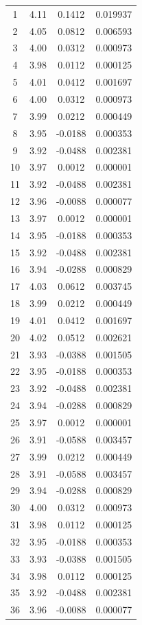 \documentclass[14pt,a4paper]{extarticle}
\begin{document}
{\begin{longtable}{|c|c|c|c|}
1  & 4.11 & 0.1412 & 0.019937 \\
2  & 4.05 & 0.0812 & 0.006593 \\
3  & 4.00 & 0.0312 & 0.000973 \\
4  & 3.98 & 0.0112 & 0.000125 \\
5  & 4.01 & 0.0412 & 0.001697 \\
6  & 4.00 & 0.0312 & 0.000973 \\
7  & 3.99 & 0.0212 & 0.000449 \\
8  & 3.95 & -0.0188 & 0.000353 \\
9  & 3.92 & -0.0488 & 0.002381 \\
10 & 3.97 & 0.0012 & 0.000001 \\
11 & 3.92 & -0.0488 & 0.002381 \\
12 & 3.96 & -0.0088 & 0.000077 \\
13 & 3.97 & 0.0012 & 0.000001 \\
14 & 3.95 & -0.0188 & 0.000353 \\
15 & 3.92 & -0.0488 & 0.002381 \\
16 & 3.94 & -0.0288 & 0.000829 \\
17 & 4.03 & 0.0612 & 0.003745 \\
18 & 3.99 & 0.0212 & 0.000449 \\
19 & 4.01 & 0.0412 & 0.001697 \\
20 & 4.02 & 0.0512 & 0.002621 \\
21 & 3.93 & -0.0388 & 0.001505 \\
22 & 3.95 & -0.0188 & 0.000353 \\
23 & 3.92 & -0.0488 & 0.002381 \\
24 & 3.94 & -0.0288 & 0.000829 \\
25 & 3.97 & 0.0012 & 0.000001 \\
26 & 3.91 & -0.0588 & 0.003457 \\
27 & 3.99 & 0.0212 & 0.000449 \\
28 & 3.91 & -0.0588 & 0.003457 \\
29 & 3.94 & -0.0288 & 0.000829 \\
30 & 4.00 & 0.0312 & 0.000973 \\
31 & 3.98 & 0.0112 & 0.000125 \\
32 & 3.95 & -0.0188 & 0.000353 \\
33 & 3.93 & -0.0388 & 0.001505 \\
34 & 3.98 & 0.0112 & 0.000125 \\
35 & 3.92 & -0.0488 & 0.002381 \\
36 & 3.96 & -0.0088 & 0.000077 \\

\end{longtable}}
\end{document}
